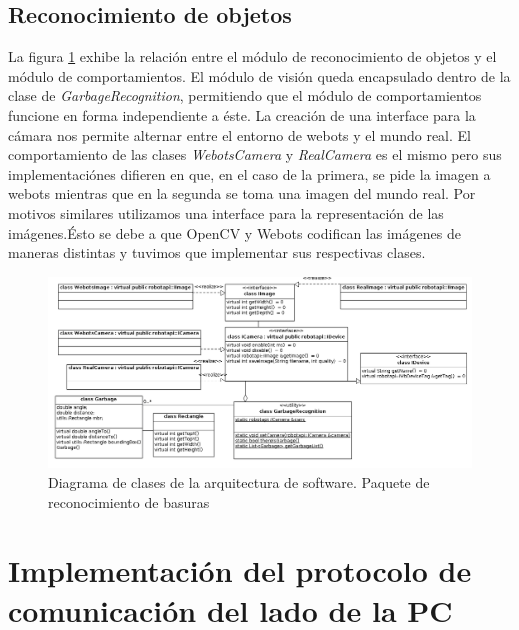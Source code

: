 \subsection{Reconocimiento de objetos}
La figura \ref{fig:soft_arq_reconmodule} exhibe la relaci\'on entre el m\'odulo de reconocimiento de 
objetos y el m\'odulo de comportamientos. El m\'odulo de visi\'on queda encapsulado dentro
de la clase de \textit{GarbageRecognition}, permitiendo que el m\'odulo de comportamientos funcione en
forma independiente a \'este. La creaci\'on de una interface para la c\'amara nos permite alternar
entre el entorno de webots y el mundo real. El comportamiento de las clases \textit{WebotsCamera} y 
\textit{RealCamera} es el mismo pero sus implementaci\'ones difieren en que, en el caso de la primera, se pide
la imagen a webots mientras
que en la segunda se toma una imagen del mundo real. Por motivos similares utilizamos una interface para 
la representaci\'on de las im\'agenes.\'Esto se debe a que OpenCV y Webots codifican las im\'agenes de
maneras distintas y tuvimos que implementar sus respectivas clases. 
\begin{landscape}
\begin{figure}[h]
	\centering
	\includegraphics[scale=0.5]{comportamientos/figures/api3.png}
	\caption[Arquitectura de software: m\'odulo de reconocimiento]{Diagrama de clases de
	la arquitectura de software. Paquete de reconocimiento de basuras}
	\label{fig:soft_arq_reconmodule}
\end{figure}
\end{landscape}

\section[Implementaci\'on del protocolo en PC]{Implementaci\'on del protocolo de comunicaci\'on del lado de la PC}
